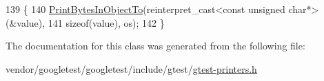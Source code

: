 \begin{DoxyCode}
139                                                          \{
140     \hyperlink{namespacetesting_1_1internal2_a04a384ee5de3a9f4f00a6052ea79b495}{PrintBytesInObjectTo}(reinterpret\_cast<const unsigned char*>(&value),
141                          \textcolor{keyword}{sizeof}(value), os);
142   \}
\end{DoxyCode}


The documentation for this class was generated from the following file\+:\begin{DoxyCompactItemize}
\item 
vendor/googletest/googletest/include/gtest/\hyperlink{gtest-printers_8h}{gtest-\/printers.\+h}\end{DoxyCompactItemize}
